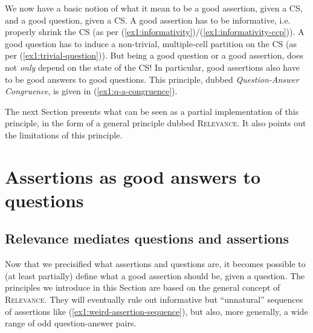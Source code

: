 \begin{exe}
	\label{ex1:trivial-question}
\end{exe}

We now have a basic notion of what it mean to be a good assertion, given a CS, and a good question, given a CS. A good assertion has to be informative, i.e. properly shrink the CS (as per (\ref{ex1:informativity})/(\ref{ex1:informativity-ccp})). A good question has to induce a non-trivial, multiple-cell partition on the CS (as per (\ref{ex1:trivial-question})). But being a good question or a good assertion, does not \textit{only} depend on the state of the CS! In particular, good assertions also have to be good answers to good questions. This principle, dubbed \textit{Question-Answer Congruence}, is given in (\ref{ex1:q-a-congruence}).

\begin{exe}
	\label{ex1:q-a-congruence}
\end{exe}

The next Section presents what can be seen as a partial implementation of this principle, in the form of a general principle dubbed \textsc{Relevance}. It also points out the limitations of this principle.


\section{Assertions as good answers to questions}\label{sec:q-a-interaction}

\subsection{Relevance mediates questions and assertions}
Now that we precisified what assertions and questions are, it becomes possible to (at least partially) define what a good assertion should be, given a question. The principles we introduce in this Section are based on the general concept of \textsc{Relevance}. They will eventually rule out informative but ``unnatural'' sequences of assertions like (\ref{ex1:weird-assertion-sequence}), but also, more generally, a wide range of odd question-answer pairs.

